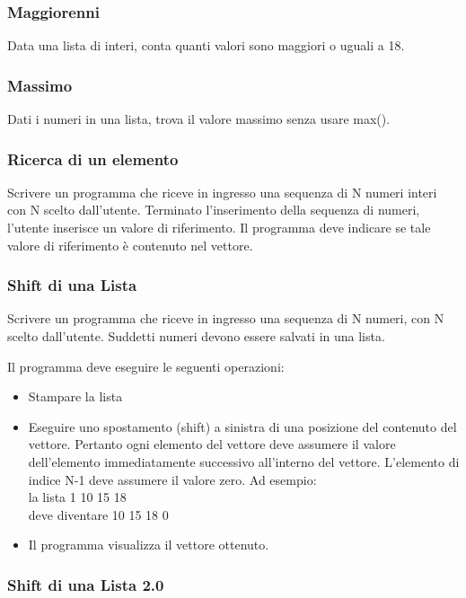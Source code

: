 \documentclass[a4paper,12pt]{article}
\begin{document}
	
	
	\subsubsection{Maggiorenni}
	Data una lista di interi, conta quanti valori sono maggiori o uguali a 18.
	
	
	\subsubsection{Massimo}
	Dati i numeri in una lista, trova il valore massimo senza usare max().
	
	\subsubsection{Ricerca di un elemento}
	Scrivere un programma che riceve in ingresso una sequenza di N numeri
	interi con N scelto dall'utente. 
	Terminato l’inserimento della sequenza di numeri, l’utente inserisce un valore di riferimento. Il programma deve indicare se tale
	valore di riferimento è contenuto nel vettore.
	
	
	\subsubsection{Shift di una Lista}
	
	Scrivere un programma che riceve in ingresso una sequenza di N numeri, con N scelto dall'utente. Suddetti numeri devono essere salvati in una lista.
	
	Il programma deve eseguire le seguenti operazioni:
	
\begin{itemize}
	\item Stampare la lista
	\item Eseguire uno spostamento (shift) a sinistra di una posizione del contenuto del vettore.
	Pertanto ogni elemento del vettore deve assumere il valore dell’elemento immediatamente successivo all’interno del vettore. L’elemento di indice N-1 deve assumere il
	valore zero.
	Ad esempio: \\ 
	la lista 1 10 15 18 \\
	deve diventare 10 15 18 0
	\item Il programma visualizza il vettore ottenuto.
\end{itemize}
	
	\subsubsection{Shift di una Lista 2.0}
	
\end{document}
